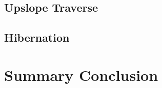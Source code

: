 



\subsection{Upslope Traverse}
\label{sec:PowerBudget:PowerBudget:UpslopeTraverse}

\subsection{Hibernation}
\label{sec:PowerBudget:PowerBudget:Hibernation}

\section{Summary Conclusion}
\label{sec:PowerBudget:SummaryAndConclusion}
